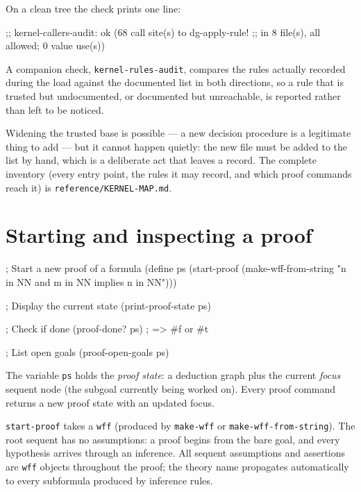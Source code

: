 On a clean tree the check prints one line:

\begin{VNBcode}
;; kernel-callers-audit: ok (68 call site(s) to dg-apply-rule!
;;   in 8 file(s), all allowed; 0 value use(s))
\end{VNBcode}

A companion check, \texttt{kernel-rules-audit}, compares the rules
actually recorded during the load against the documented list in both
directions, so a rule that is trusted but undocumented, or documented but
unreachable, is reported rather than left to be noticed.

Widening the trusted base is possible --- a new decision procedure is a
legitimate thing to add --- but it cannot happen quietly: the new file
must be added to the list by hand, which is a deliberate act that leaves
a record.  The complete inventory (every entry point, the rules it may
record, and which proof commands reach it) is
\texttt{reference/KERNEL-MAP.md}.

\section{Starting and inspecting a proof}

\begin{VNBcode}
; Start a new proof of a formula
(define ps (start-proof (make-wff-from-string
  "n in NN and m in NN implies n in NN")))

; Display the current state
(print-proof-state ps)

; Check if done
(proof-done? ps)   ; => #f or #t

; List open goals
(proof-open-goals ps)
\end{VNBcode}

The variable \texttt{ps} holds the \emph{proof state}: a deduction graph
plus the current \emph{focus} sequent node (the subgoal currently being
worked on).  Every proof command returns a new proof state with an
updated focus.

\texttt{start-proof} takes a \texttt{wff} (produced by \texttt{make-wff} or \texttt{make-wff-from-string}).
The root sequent has no assumptions: a proof begins from the bare goal,
and every hypothesis arrives through an inference.  All sequent assumptions and assertions are
\texttt{wff} objects throughout the proof; the theory name propagates
automatically to every subformula produced by inference rules.

